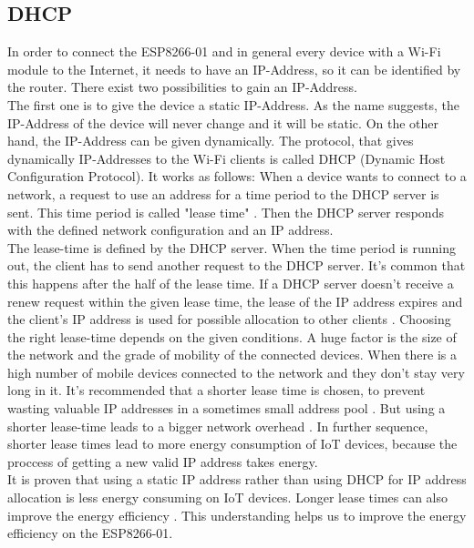 \subsection{DHCP}
In order to connect the ESP8266-01 and in general every device with a Wi-Fi module to the Internet, it needs to have an IP-Address, so it can be identified by the router. 
There exist two possibilities to gain an IP-Address.\\ The first one is to give the device a static IP-Address. As the name suggests, the IP-Address of the device will never change and it will be static. On the other hand, the IP-Address can be given dynamically.
The protocol, that gives dynamically IP-Addresses to the Wi-Fi clients is called DHCP (Dynamic Host Configuration Protocol).
It works as follows: When a device wants to connect to a network, a request to use an address for a time period to the DHCP server is sent. This time period is called "lease time" \cite{droms1997rfc2131}. Then the DHCP server responds with the defined network configuration and an IP address.\\
The lease-time is defined by the DHCP server. When the time period is running out, the client has to send another request to the DHCP server. It's common that this happens after the half of the lease time.
If a DHCP server doesn't receive a renew request within the given lease time, the lease of the IP address expires and the client's IP address is used for possible allocation to other clients \cite{10.1145/1298306.1298315}.
Choosing the right lease-time depends on the given conditions. A huge factor is the size of the network and the grade of mobility of the connected devices. When there is a high number of mobile devices connected to the network and they don't stay very long in it. It's recommended that a shorter lease time is chosen, to prevent wasting valuable IP addresses in a sometimes small address pool \cite{khadilkar2007usage}.
But using a shorter lease-time leads to a bigger network overhead \cite{li_how_2018}. In further sequence, shorter lease times lead to more energy consumption of IoT devices, because the proccess of getting a new valid IP address takes energy.\\
It is proven that using a static IP address rather than using DHCP for IP address allocation is less energy consuming on IoT devices. Longer lease times can also improve the energy efficiency \cite{department_of_computer_engineering_mehmet_akif_ersoy_university_faculty_of_engineering_and_architecture_burdur_turkey_power_2020}. This understanding helps us to improve the energy efficiency on the ESP8266-01.




